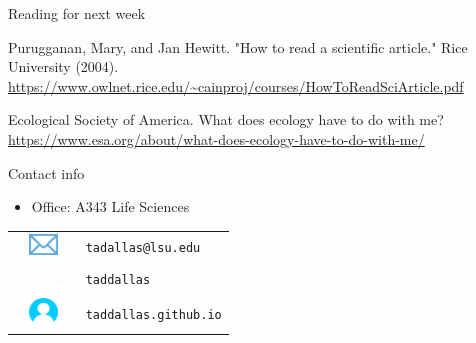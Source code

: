 \documentclass[12pt]{beamer}
\begin{document}
\begin{frame}

	\begin{flushright}
	  \Large \textcolor{boss2}{Reading for next week} 
	\end{flushright}

Purugganan, Mary, and Jan Hewitt. "How to read a scientific article." Rice University (2004). \url{https://www.owlnet.rice.edu/~cainproj/courses/HowToReadSciArticle.pdf}



Ecological Society of America. What does ecology have to do with me? \url{https://www.esa.org/about/what-does-ecology-have-to-do-with-me/}


\end{frame}











\begin{frame}

{\large \textcolor{lsu1}{Contact info}}

  \begin{itemize}
    \item \textcolor{boss1}{Office:} A343 Life Sciences
  \end{itemize}

  \begin{flushright}
    \begin{tabular}{cl}
    \includegraphics[width=0.75cm]{figs/email.png} & \texttt{tadallas@lsu.edu} \\
    \includegraphics[width=1.5cm]{figs/octocat.png} & \texttt{taddallas} \\
    \includegraphics[width=0.75cm]{figs/user.png} & \texttt{taddallas.github.io}\\
   \end{tabular}
  \end{flushright}
\end{frame}
\end{document}
